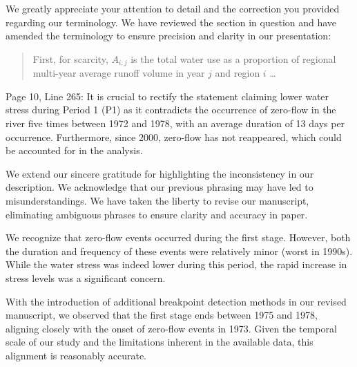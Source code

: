 \AR{} We greatly appreciate your attention to detail and the correction you provided regarding our terminology. We have reviewed the section in question and have amended the terminology to ensure precision and clarity in our presentation:

\begin{quote}
	First, for scarcity, $A_{i, j}$ is the total water use as a proportion of regional multi-year average runoff volume in year $j$ and region $i$ \dots
\end{quote}

\RC{} Page 10, Line 265: It is crucial to rectify the statement claiming lower water stress during Period 1 (P1) as it contradicts the occurrence of zero-flow in the river five times between 1972 and 1978, with an average duration of 13 days per occurrence. Furthermore, since 2000, zero-flow has not reappeared, which could be accounted for in the analysis.

\AR{} We extend our sincere gratitude for highlighting the inconsistency in our description. We acknowledge that our previous phrasing may have led to misunderstandings. We have taken the liberty to revise our manuscript, eliminating ambiguous phrases to ensure clarity and accuracy in paper.

\AR*{} We recognize that zero-flow events occurred during the first stage. However, both the duration and frequency of these events were relatively minor (worst in 1990s). While the water stress was indeed lower during this period, the rapid increase in stress levels was a significant concern.

\AR*{} With the introduction of additional breakpoint detection methods in our revised manuscript, we observed that the first stage ends between 1975 and 1978, aligning closely with the onset of zero-flow events in 1973. Given the temporal scale of our study and the limitations inherent in the available data, this alignment is reasonably accurate.

